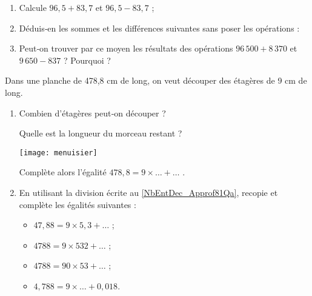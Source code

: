 \begin{exercice}

\begin{enumerate}
 \item Calcule $96,5 + 83,7$ et $96,5 - 83,7$ ;
 \item Déduis‑en les sommes et les différences suivantes sans poser les opérations :
 \item Peut‑on trouver par ce moyen les résultats des opérations $96\,500 + 8\,370$ et $9\,650 - 837$ ? Pourquoi ?
 \end{enumerate}
\end{exercice}


\begin{exercice}

Dans une planche de 478,8 cm de long, on veut découper des étagères de 9 cm de long.
\begin{enumerate}
 \item Combien d'étagères peut‑on découper ? 

Quelle est la longueur du morceau restant ? 

\begin{center} \texttt{[image: menuisier]} \end{center}

Complète alors l'égalité $478,8 = 9 \times \ldots + \ldots$ . \label{NbEntDec_Approf81Qa}

 \item En utilisant la division écrite au \ref{NbEntDec_Approf81Qa}, recopie et complète les égalités suivantes :
 \begin{itemize}  
  \item $47,88 = 9 \times 5,3 + \ldots$ ;
  \item $4 788 = 9 \times 532 + \ldots$ ;
  \item $4 788 = 90 \times 53 + \ldots$ ;
  \item $4,788 = 9 \times \ldots + 0,018$.
  \end{itemize}
 \end{enumerate}
\end{exercice}


